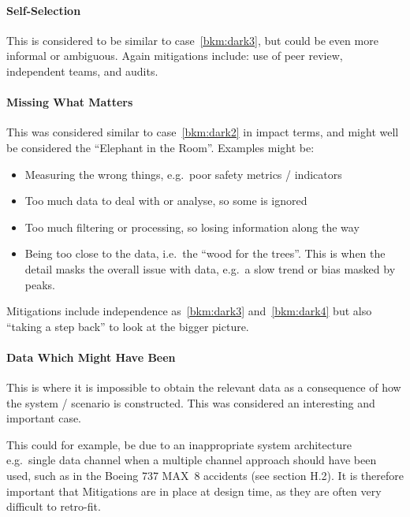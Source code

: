 \paragraph{Self-Selection}\label{bkm:dark4}
This is considered to be similar to case~\ref{bkm:dark3}, but could be even more informal or ambiguous. Again mitigations include: use of peer review, independent teams, and audits.

\paragraph{Missing What Matters}\label{bkm:dark5}
This was considered similar to case~\ref{bkm:dark2} in impact terms, and might well be considered the “Elephant in the Room”. Examples might be:
\begin{itemize}
\item Measuring the wrong things, e.g.\ poor safety metrics / indicators
  \item Too much data to deal with or analyse, so some is ignored
  \item Too much filtering or processing, so losing \gls{information} along the way
  \item Being too close to the data, i.e.\ the “wood for the trees”. This is when the detail masks the overall issue with data, e.g.\ a slow trend or bias masked by peaks.
\end{itemize}

Mitigations include independence as~\ref{bkm:dark3} and~\ref{bkm:dark4} but also “taking a step back” to look at the bigger picture.

\paragraph{Data Which Might Have Been}\label{bkm:dark6}
This is where it is impossible to obtain the relevant data as a consequence of how the system / scenario is constructed. This was considered an interesting and important case.

This could for example, be due to an inappropriate system architecture e.g.\ single data channel when a multiple channel approach should have been used, such as in the Boeing 737 MAX~8 accidents (see section H.2). It is therefore important that Mitigations are in place at design time, as they are often very difficult to retro-fit.

